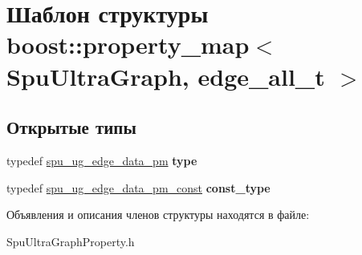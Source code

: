 \hypertarget{structboost_1_1property__map_3_01_spu_ultra_graph_00_01edge__all__t_01_4}{}\section{Шаблон структуры boost\+:\+:property\+\_\+map$<$ Spu\+Ultra\+Graph, edge\+\_\+all\+\_\+t $>$}
\label{structboost_1_1property__map_3_01_spu_ultra_graph_00_01edge__all__t_01_4}
\subsection*{Открытые типы}
\begin{DoxyCompactItemize}
\item 
\mbox{\label{structboost_1_1property__map_3_01_spu_ultra_graph_00_01edge__all__t_01_4_a3c9587a2e31d7bde52a169fb3f0947e1}} 
typedef \hyperlink{classboost_1_1spu__ug__property__map}{spu\+\_\+ug\+\_\+edge\+\_\+data\+\_\+pm} {\bfseries type}
\item 
\mbox{\label{structboost_1_1property__map_3_01_spu_ultra_graph_00_01edge__all__t_01_4_aeb3d171003be0e05d9f79a1787329e41}} 
typedef \hyperlink{classboost_1_1spu__ug__readable__property__map}{spu\+\_\+ug\+\_\+edge\+\_\+data\+\_\+pm\+\_\+const} {\bfseries const\+\_\+type}
\end{DoxyCompactItemize}


Объявления и описания членов структуры находятся в файле\+:\begin{DoxyCompactItemize}
\item 
Spu\+Ultra\+Graph\+Property.\+h\end{DoxyCompactItemize}
